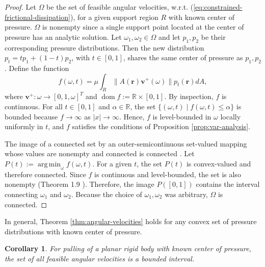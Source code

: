 \documentclass[conference]{IEEEtran}
\newtheorem{corollary}{Corollary}
\DeclareMathOperator*{\argmin}{arg\,min}
\DeclareMathOperator{\dom}{dom}
\begin{document}
\begin{proof}
  Let $\Omega$ be the set of feasible angular velocities,
  w.r.t. (\ref{eq:constrained-frictional-dissipation}), for a given
  support region $R$ with known center of pressure. $\Omega$ is
  nonempty since a single support point located at the center of
  pressure has an analytic solution. Let
  $\omega_1, \omega_2 \in \Omega$ and let $p_1, p_2$ be their
  corresponding pressure distributions. Then the new distribution
  $p_t = tp_1 + (1-t)p_2$, with $t \in [0,1]$, shares the same center
  of pressure as $p_1,p_2$. Define the function
  \begin{equation}
    f(\omega, t) = \mu\int_R\lVert A(\mathbf{r})\mathbf{v}^+(\omega)\rVert p_t(\mathbf{r})dA,
  \end{equation}
  where $\mathbf{v}^+: \omega \rightarrow [0,1,\omega]^T$ and
  $\dom f:= \mathbb{R}\times[0,1]$. By inspection, $f$ is
  continuous. For all $t \in [0,1]$ and $\alpha \in \mathbb{R}$, the
  set $\{(\omega,t)\;|\;f(\omega,t)\leq \alpha\}$ is bounded because
  $f \rightarrow \infty$ as $|x|\rightarrow \infty$. Hence, $f$ is
  level-bounded in $\omega$ locally uniformly in $t$, and $f$
  satisfies the conditions of Proposition \ref{prop:var-analysis}.

  The image of a connected set by an outer-semicontinuous set-valued
  mapping whose values are nonempty and connected is connected
  \cite{hiriart1985images}. Let $P(t) := \argmin_\omega f(\omega,t)$.
  For a given $t$, the set $P(t)$ is convex-valued and therefore
  connected. Since $f$ is continuous and level-bounded, the set is
  also nonempty (Theorem 1.9 \cite{Rockafellar}). Therefore, the image
  $P([0,1])$ contains the interval connecting $\omega_1$ and
  $\omega_2$. Because the choice of $\omega_1,\omega_2$ was arbitrary,
  $\Omega$ is connected.
\end{proof}

In general, Theorem \ref{thm:angular-velocities} holds for any convex%
set of pressure distributions with known center of pressure. 


\begin{corollary}
  For pulling of a planar rigid body with known center of pressure,
  the set of all feasible angular velocities is a bounded interval.
\end{corollary}
\end{document}
